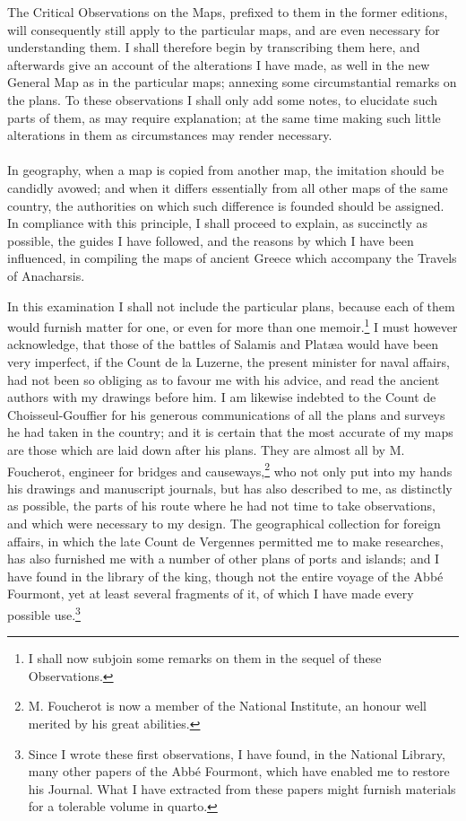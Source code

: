 \documentclass[a4paper, 11pt, oneside, polutonikogreek, english]{article}
\begin{document}
The Critical Observations on the Maps, prefixed to them in the former editions, will consequently still apply to the particular maps, and are even necessary for understanding them. I shall therefore begin by transcribing them here, and afterwards give an account of the alterations I have made, as well in the new General Map as in the particular maps; annexing some circumstantial remarks on the plans. To these observations I shall only add some notes, to elucidate such parts of them, as may require explanation; at the same time making such little alterations in them as circumstances may render necessary.

{\color{Black}\bigskip
\centerline{\EightStarTaper}
\centerline{\EightStarTaper\EightStarTaper}
\bigskip}
\paragraph{}
In geography, when a map is copied from another map, the imitation should be candidly avowed; and when it differs essentially from all other maps of the same country, the authorities on which such difference is founded should be assigned. In compliance with this principle, I shall proceed to explain, as succinctly as possible, the guides I have followed, and the reasons by which I have been influenced, in compiling the maps of ancient Greece which accompany the Travels of Anacharsis.

In this examination I shall not include the particular plans, because each of them would furnish matter for one, or even for more than one memoir.\footnote{I shall now subjoin some remarks on them in the sequel of these Observations.} I must however acknowledge, that those of the battles of Salamis and Platæa would have been very imperfect, if the Count de la Luzerne, the present minister for naval affairs, had not been so obliging as to favour me with his advice, and read the ancient authors with my drawings before him. I am likewise indebted to the Count de Choisseul-Gouffier for his generous communications of all the plans and surveys he had taken in the country; and it is certain that the most accurate of my maps are those which are laid down after his plans. They are almost all by M. Foucherot, engineer for bridges and causeways,\footnote{M. Foucherot is now a member of the National Institute, an honour well merited by his great abilities.} who not only put into my hands his drawings and manuscript journals, but has also described to me, as distinctly as possible, the parts of his route where he had not time to take observations, and which were necessary to my design. The geographical collection for foreign affairs, in which the late Count de Vergennes permitted me to make researches, has also furnished me with a number of other plans of ports and islands; and I have found in the library of the king, though not the entire voyage of the Abbé Fourmont, yet at least several fragments of it, of which I have made every possible use.\footnote{Since I wrote these first observations, I have found, in the National Library, many other papers of the Abbé Fourmont, which have enabled me to restore his Journal. What I have extracted from these papers might furnish materials for a tolerable volume in quarto.}
\end{document}
